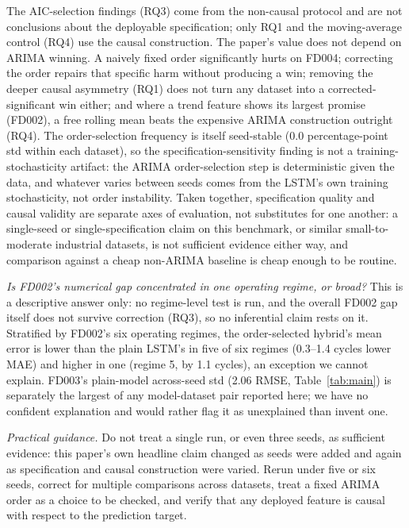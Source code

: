 \documentclass[conference]{IEEEtran}
\begin{document}
The AIC-selection findings (RQ3) come from the non-causal protocol and are not conclusions about the deployable specification; only RQ1 and the moving-average control (RQ4) use the causal construction. The paper's value does not depend on ARIMA winning. A naively fixed order significantly hurts on FD004; correcting the order repairs that specific harm without producing a win; removing the deeper causal asymmetry (RQ1) does not turn any dataset into a corrected-significant win either; and where a trend feature shows its largest promise (FD002), a free rolling mean beats the expensive ARIMA construction outright (RQ4). The order-selection frequency is itself seed-stable (0.0 percentage-point std within each dataset), so the specification-sensitivity finding is not a training-stochasticity artifact: the ARIMA order-selection step is deterministic given the data, and whatever varies between seeds comes from the LSTM's own training stochasticity, not order instability. Taken together, specification quality and causal validity are separate axes of evaluation, not substitutes for one another: a single-seed or single-specification claim on this benchmark, or similar small-to-moderate industrial datasets, is not sufficient evidence either way, and comparison against a cheap non-ARIMA baseline is cheap enough to be routine.

\emph{Is FD002's numerical gap concentrated in one operating regime, or broad?} This is a descriptive answer only: no regime-level test is run, and the overall FD002 gap itself does not survive correction (RQ3), so no inferential claim rests on it. Stratified by FD002's six operating regimes, the order-selected hybrid's mean error is lower than the plain LSTM's in five of six regimes (0.3--1.4 cycles lower MAE) and higher in one (regime 5, by 1.1 cycles), an exception we cannot explain. FD003's plain-model across-seed std (2.06 RMSE, Table~\ref{tab:main}) is separately the largest of any model-dataset pair reported here; we have no confident explanation and would rather flag it as unexplained than invent one.

\emph{Practical guidance.} Do not treat a single run, or even three seeds, as sufficient evidence: this paper's own headline claim changed as seeds were added and again as specification and causal construction were varied. Rerun under five or six seeds, correct for multiple comparisons across datasets, treat a fixed ARIMA order as a choice to be checked, and verify that any deployed feature is causal with respect to the prediction target.
\end{document}
